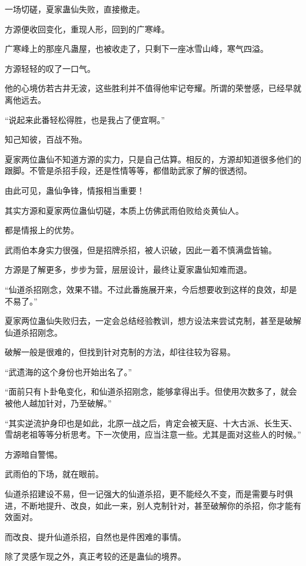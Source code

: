 
\begin{this_body}

一场切磋，夏家蛊仙失败，直接撤走。

方源便收回变化，重现人形，回到的广寒峰。

广寒峰上的那座凡蛊屋，也被收走了，只剩下一座冰雪山峰，寒气四溢。

方源轻轻的叹了一口气。

他的心境仿若古井无波，这些胜利并不值得他牢记夸耀。所谓的荣誉感，已经早就离他远去。

“说起来此番轻松得胜，也是我占了便宜啊。”

知己知彼，百战不殆。

夏家两位蛊仙不知道方源的实力，只是自己估算。相反的，方源却知道很多他们的跟脚。不管是杀招手段，还是性情等等，都借助武家了解的很透彻。

由此可见，蛊仙争锋，情报相当重要！

其实方源和夏家两位蛊仙切磋，本质上仿佛武雨伯败给炎黄仙人。

都是情报上的优势。

武雨伯本身实力很强，但是招牌杀招，被人识破，因此一着不慎满盘皆输。

方源是了解更多，步步为营，层层设计，最终让夏家蛊仙知难而退。

“仙道杀招刚念，效果不错。不过此番施展开来，今后想要收到这样的良效，却是不易了。”

夏家两位蛊仙失败归去，一定会总结经验教训，想方设法来尝试克制，甚至是破解仙道杀招刚念。

破解一般是很难的，但找到针对克制的方法，却往往较为容易。

“武遗海的这个身份也开始出名了。”

“面前只有卜卦龟变化，和仙道杀招刚念，能够拿得出手。但使用次数多了，就会被他人越加针对，乃至破解。”

“其实逆流护身印也是如此，北原一战之后，肯定会被天庭、十大古派、长生天、雪胡老祖等等分析思考。下一次使用，应当注意一些。尤其是面对这些人的时候。”

方源暗自警惕。

武雨伯的下场，就在眼前。

仙道杀招建设不易，但一记强大的仙道杀招，更不能经久不变，而是需要与时俱进，不断地提升、改良，如此一来，别人克制针对，甚至破解你的杀招，你才能有效面对。

而改良、提升仙道杀招，自然也是件困难的事情。

除了灵感乍现之外，真正考较的还是蛊仙的境界。


\end{this_body}

